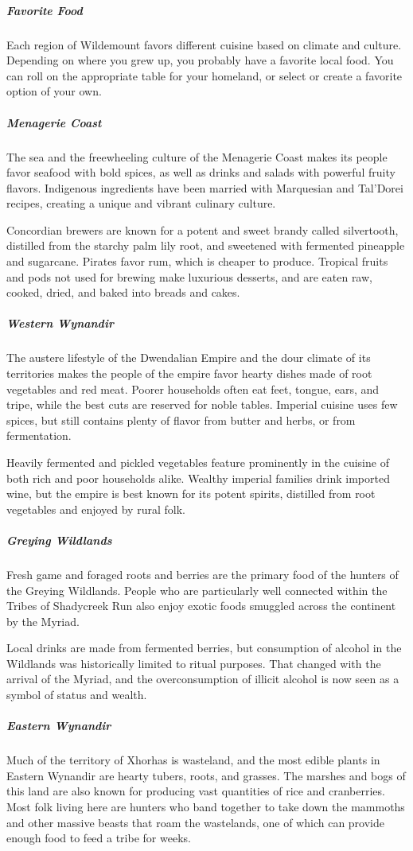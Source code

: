 \documentclass[10pt,a4paper,twoside,bg=print,twocolumn,openany,nodeprecatedcode]{dndbook}
\begin{document}
\subparagraph{Favorite Food}
Each region of Wildemount favors different cuisine based on climate and culture. Depending on where you grew up, you probably have a favorite local food. You can roll on the appropriate table for your homeland, or select or create a favorite option of your own.

\subparagraph{Menagerie Coast}
The sea and the freewheeling culture of the Menagerie Coast makes its people favor seafood with bold spices, as well as drinks and salads with powerful fruity flavors. Indigenous ingredients have been married with Marquesian and Tal'Dorei recipes, creating a unique and vibrant culinary culture.

Concordian brewers are known for a potent and sweet brandy called silvertooth, distilled from the starchy palm lily root, and sweetened with fermented pineapple and sugarcane. Pirates favor rum, which is cheaper to produce. Tropical fruits and pods not used for brewing make luxurious desserts, and are eaten raw, cooked, dried, and baked into breads and cakes.

\subparagraph{Western Wynandir}
The austere lifestyle of the Dwendalian Empire and the dour climate of its territories makes the people of the empire favor hearty dishes made of root vegetables and red meat. Poorer households often eat feet, tongue, ears, and tripe, while the best cuts are reserved for noble tables. Imperial cuisine uses few spices, but still contains plenty of flavor from butter and herbs, or from fermentation.

Heavily fermented and pickled vegetables feature prominently in the cuisine of both rich and poor households alike. Wealthy imperial families drink imported wine, but the empire is best known for its potent spirits, distilled from root vegetables and enjoyed by rural folk.

\subparagraph{Greying Wildlands}
Fresh game and foraged roots and berries are the primary food of the hunters of the Greying Wildlands. People who are particularly well connected within the Tribes of Shadycreek Run also enjoy exotic foods smuggled across the continent by the Myriad.

Local drinks are made from fermented berries, but consumption of alcohol in the Wildlands was historically limited to ritual purposes. That changed with the arrival of the Myriad, and the overconsumption of illicit alcohol is now seen as a symbol of status and wealth.

\subparagraph{Eastern Wynandir}
Much of the territory of Xhorhas is wasteland, and the most edible plants in Eastern Wynandir are hearty tubers, roots, and grasses. The marshes and bogs of this land are also known for producing vast quantities of rice and cranberries. Most folk living here are hunters who band together to take down the mammoths and other massive beasts that roam the wastelands, one of which can provide enough food to feed a tribe for weeks.
\end{document}
